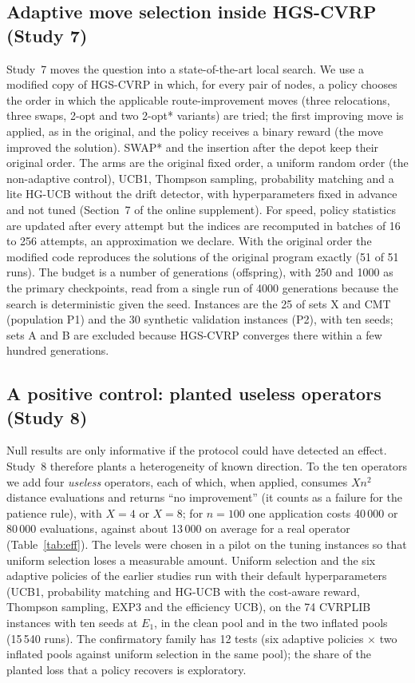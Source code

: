 \subsection{Adaptive move selection inside HGS-CVRP (Study 7)}\label{sec:hgsaos}
Study~7 moves the question into a state-of-the-art local search. We use a modified copy of HGS-CVRP \citep{vidal2022} in which, for every pair of nodes, a policy chooses the order in which the applicable route-improvement moves (three relocations, three swaps, 2-opt and two 2-opt* variants) are tried; the first improving move is applied, as in the original, and the policy receives a binary reward (the move improved the solution). SWAP* and the insertion after the depot keep their original order. The arms are the original fixed order, a uniform random order (the non-adaptive control), UCB1, Thompson sampling, probability matching and a lite HG-UCB without the drift detector, with hyperparameters fixed in advance and not tuned (Section~7 of the online supplement). For speed, policy statistics are updated after every attempt but the indices are recomputed in batches of 16 to 256 attempts, an approximation we declare. With the original order the modified code reproduces the solutions of the original program exactly (51 of 51 runs). The budget is a number of generations (offspring), with 250 and 1000 as the primary checkpoints, read from a single run of 4000 generations because the search is deterministic given the seed. Instances are the 25 of sets X and CMT (population P1) and the 30 synthetic validation instances (P2), with ten seeds; sets A and B are excluded because HGS-CVRP converges there within a few hundred generations.

\subsection{A positive control: planted useless operators (Study 8)}\label{sec:s8design}
Null results are only informative if the protocol could have detected an effect. Study~8 therefore plants a heterogeneity of known direction. To the ten operators we add four \emph{useless} operators, each of which, when applied, consumes $X n^2$ distance evaluations and returns ``no improvement'' (it counts as a failure for the patience rule), with $X=4$ or $X=8$; for $n=100$ one application costs 40\,000 or 80\,000 evaluations, against about 13\,000 on average for a real operator (Table~\ref{tab:eff}). The levels were chosen in a pilot on the tuning instances so that uniform selection loses a measurable amount. Uniform selection and the six adaptive policies of the earlier studies run with their default hyperparameters (UCB1, probability matching and HG-UCB with the cost-aware reward, Thompson sampling, EXP3 and the efficiency UCB), on the 74 CVRPLIB instances with ten seeds at $E_1$, in the clean pool and in the two inflated pools (15\,540 runs). The confirmatory family has 12 tests (six adaptive policies $\times$ two inflated pools against uniform selection in the same pool); the share of the planted loss that a policy recovers is exploratory.

